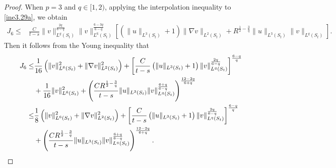 \documentclass[11pt,reqno]{amsart}
\numberwithin{Thm}{section}
\begin{document}
\begin{proof}
	When $p=3$ and $q\in[1,2)$, applying the interpolation inequality to \eqref{ine3.29a}, we obtain
	\begin{align}
		J_6 \leq& \frac{C}{t-s}\|v\|_{L^q(S_t)}^{\frac{2q}{6-q}} \|v\|_{L^6(S_t)}^{\frac{6-3q}{6-q}} \left[\left(\|u\|_{L^3(S_t)}+1\right)\|\nabla v\|_{L^2(S_t)} + R^{\frac{1}{2}-\frac{3}{q}}\|u\|_{L^3(S_t)}\|v\|_{L^q(S_t)}\right].\label{ine3.33a}
	\end{align}
Then it follows from the Young inequality that
	\begin{align}
		J_6 \leq& \frac{1}{16}\left( \|v\|_{L^6(S_t)}^2 + \|\nabla v\|_{L^2(S_t)}^2 \right)
		+ \left[ \frac{C}{t-s}\left(\|u\|_{L^3(S_t)}+1\right)\|v\|_{L^q(S_t)}^{\frac{2q}{6-q}} \right]^{\frac{6-q}{q}}\notag\\
		&+\frac{1}{16}\|v\|_{L^6(S_t)}^2 + \left( \frac{C R^{\frac{1}{2}-\frac{3}{q}}}{t-s}\|u\|_{L^3(S_t)}\|v\|_{L^q(S_t)}^{\frac{6+q}{6-q}} \right)^{\frac{12-2q}{6+q}}\notag\\
       \leq& \frac{1}{8}\left( \|v\|_{L^6(S_t)}^2 + \|\nabla v\|_{L^2(S_t)}^2 \right)
		+ \left[ \frac{C}{t-s}\left(\|u\|_{L^3(S_t)}+1\right)\|v\|_{L^q(S_t)}^{\frac{2q}{6-q}} \right]^{\frac{6-q}{q}}\label{ine3.34a}\\
		&+ \left( \frac{C R^{\frac{1}{2}-\frac{3}{q}}}{t-s}\|u\|_{L^3(S_t)}\|v\|_{L^q(S_t)}^{\frac{6+q}{6-q}} \right)^{\frac{12-2q}{6+q}}. \notag
	\end{align}



\end{proof}
\end{document}
